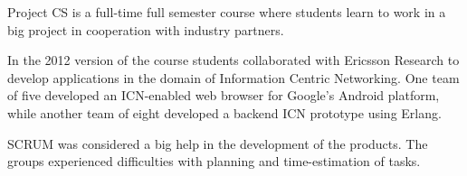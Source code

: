 Project CS is a full-time full semester course where students learn to work in a big project in cooperation with industry partners.

In the 2012 version of the course students collaborated with Ericsson Research to develop applications in the domain of Information Centric Networking.  One team of five developed an ICN-enabled web browser for Google's Android platform, while another team of eight developed a backend ICN prototype using Erlang.

SCRUM was considered a big help in the development of the products.
The groups experienced difficulties with planning and time-estimation of tasks.